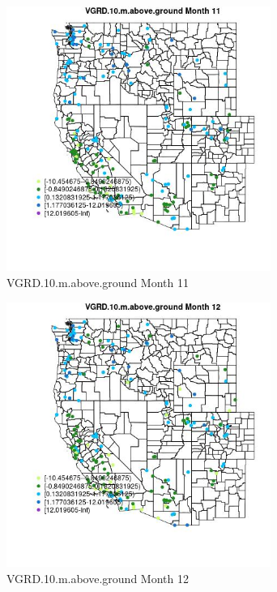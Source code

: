 \begin{figure} 
\centering  
\includegraphics[width=0.77\textwidth]{Code_Outputs/Report_ML_input_PM25_Step4_part_e_de_duplicated_aveswNAs_MapObsMo11VGRD10maboveground.jpg} 
\caption{\label{fig:Report_ML_input_PM25_Step4_part_e_de_duplicated_aveswNAsMapObsMo11VGRD10maboveground}VGRD.10.m.above.ground Month 11} 
\end{figure} 
 

\begin{figure} 
\centering  
\includegraphics[width=0.77\textwidth]{Code_Outputs/Report_ML_input_PM25_Step4_part_e_de_duplicated_aveswNAs_MapObsMo12VGRD10maboveground.jpg} 
\caption{\label{fig:Report_ML_input_PM25_Step4_part_e_de_duplicated_aveswNAsMapObsMo12VGRD10maboveground}VGRD.10.m.above.ground Month 12} 
\end{figure} 
 

